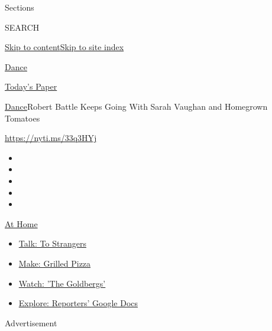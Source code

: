 Sections

SEARCH

\protect\hyperlink{site-content}{Skip to
content}\protect\hyperlink{site-index}{Skip to site index}

\href{https://www.nytimes.com/section/arts/dance}{Dance}

\href{https://myaccount.nytimes.com/auth/login?response_type=cookie\&client_id=vi}{}

\href{https://www.nytimes.com/section/todayspaper}{Today's Paper}

\href{/section/arts/dance}{Dance}\textbar{}Robert Battle Keeps Going
With Sarah Vaughan and Homegrown Tomatoes

\url{https://nyti.ms/33q3HYj}

\begin{itemize}
\item
\item
\item
\item
\item
\end{itemize}

\href{https://www.nytimes.com/spotlight/at-home?action=click\&pgtype=Article\&state=default\&region=TOP_BANNER\&context=at_home_menu}{At
Home}

\begin{itemize}
\tightlist
\item
  \href{https://www.nytimes.com/2020/08/03/well/family/the-benefits-of-talking-to-strangers.html?action=click\&pgtype=Article\&state=default\&region=TOP_BANNER\&context=at_home_menu}{Talk:
  To Strangers}
\item
  \href{https://www.nytimes.com/2020/08/01/at-home/coronavirus-make-pizza-on-a-grill.html?action=click\&pgtype=Article\&state=default\&region=TOP_BANNER\&context=at_home_menu}{Make:
  Grilled Pizza}
\item
  \href{https://www.nytimes.com/2020/07/31/arts/television/goldbergs-abc-stream.html?action=click\&pgtype=Article\&state=default\&region=TOP_BANNER\&context=at_home_menu}{Watch:
  'The Goldbergs'}
\item
  \href{https://www.nytimes.com/interactive/2020/at-home/even-more-reporters-editors-diaries-lists-recommendations.html?action=click\&pgtype=Article\&state=default\&region=TOP_BANNER\&context=at_home_menu}{Explore:
  Reporters' Google Docs}
\end{itemize}

Advertisement

